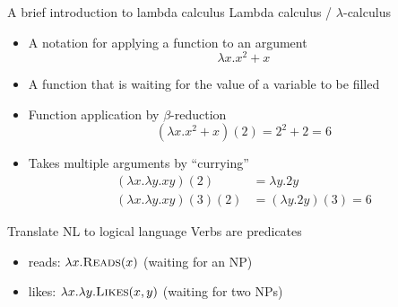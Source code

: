 \documentclass[usenames,dvipsnames,notes,11pt,aspectratio=169]{beamer}
\begin{document}
\begin{frame}
    {A brief introduction to lambda calculus}
    Lambda calculus / $\lambda$-calculus\\
    \begin{itemize}
        \item A notation for applying a function to an argument
              $$\lambda x.x^2+x$$
        \item A function that is waiting for the value of a variable to be filled
        \item Function application by $\beta$-reduction
            $$(\lambda x.x^2+x)(2) = 2^2+2 = 6$$
        \item Takes multiple arguments by ``currying''
            \begin{align*}
                (\lambda x.\lambda y.xy)(2) &= \lambda y.2y \\
                (\lambda x.\lambda y.xy)(3)(2) &= (\lambda y.2y)(3) = 6
            \end{align*}
    \end{itemize}
\end{frame}

\begin{frame}
    {Translate NL to logical language}
    Verbs are predicates \\
    \begin{itemize}
        \item reads: $\lambda x.\textsc{Reads}(x)$ (waiting for an NP)
        \item likes: $\lambda x.\lambda y.\textsc{Likes}(x,y)$ (waiting for two NPs)
    \end{itemize}
    \centering
\end{frame}
\end{document}
